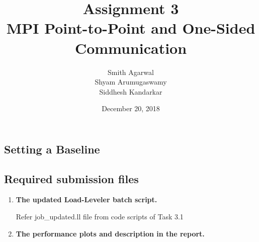 \documentclass[10pt, letterpaper, twoside]{article}
\title{Assignment 3 \\ MPI Point-to-Point and One-Sided Communication}
\author{Smith Agarwal \\ Shyam Arumugaswamy \\ Siddhesh Kandarkar}
\date{December 20, 2018}
\begin{document}
 
\begin{titlepage}
\maketitle


\section{Setting a Baseline}

\subsection{Required submission files}

\begin{enumerate}
\item \textbf{The updated Load-Leveler batch script.} 

Refer job\_updated.ll file from code scripts of Task 3.1   

\item \textbf{The performance plots and description in the report.} 


\end{enumerate}
\end{titlepage}
\end{document}
